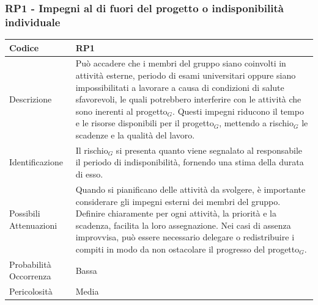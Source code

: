 \documentclass[10pt]{article}
\begin{document}
{    \subsubsection{RP1 - Impegni al di fuori del progetto o indisponibilità individuale}
    \label{RP1}
    \begin{tabularx}{\textwidth}{|l|X|}
    \hline
    \rowcolor{gray!25}
    Codice & RP1 \\
    \hline
    Descrizione &  Può accadere che i membri del gruppo siano coinvolti in attività esterne, periodo di esami universitari oppure siano impossibilitati a lavorare a causa di condizioni di salute sfavorevoli, le quali potrebbero interferire con le attività che sono inerenti al progetto$_G$. Questi impegni riducono il tempo e le risorse disponibili per il progetto$_G$, mettendo a rischio$_G$ le scadenze e la qualità del lavoro. \\
    \hline
    Identificazione & Il rischio$_G$ si presenta quanto viene segnalato al responsabile il periodo di indisponibilità, fornendo una stima della durata di esso. \\
    \hline
    Possibili Attenuazioni &  Quando si pianificano delle attività da svolgere, è importante considerare gli impegni esterni dei membri del gruppo. Definire chiaramente per ogni attività, la priorità e la scadenza, facilita la loro assegnazione. Nei casi di assenza improvvisa, può essere necessario delegare o redistribuire i compiti in modo da non ostacolare il progresso del progetto$_G$. \\
    \hline
    Probabilità Occorrenza &  Bassa \\
    \hline
    Pericolosità & Media \\ 
    \hline
    \end{tabularx}
    

}
\end{document}
